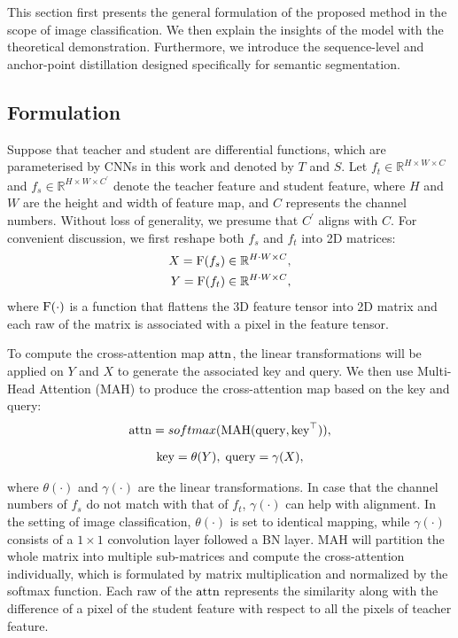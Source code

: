 \documentclass[10pt,twocolumn,letterpaper]{article}
\begin{document}
This section first presents the general formulation of the proposed method in the scope of image classification. We then explain the insights of the model with the theoretical demonstration. Furthermore, we introduce the sequence-level and anchor-point distillation designed specifically for semantic segmentation.  

\subsection{Formulation}
\label{sec:formulation}
Suppose that teacher and student are differential functions, which are parameterised by CNNs in this work and denoted by $T$ and $S$. Let $f_t\in {\mathbb{R}^{H\times W\times C}}$ and ${f_s}\in \mathbb{R}^{H\times W\times C^{'}}$ denote the teacher feature and student feature, where $H$ and $W$ are the height and width of feature map, and $C$ represents the channel numbers. Without loss of generality, we presume that $C^{'}$ aligns with $C$. For convenient discussion, we first reshape both $f_s$ and $f_t$ into 2D matrices:
\begin{equation}
\begin{aligned}
    X={\rm{F}}(f_s)\in \mathbb{R}^{H\cdot W \times C},\\ Y={\rm{F}}(f_t)\in \mathbb{R}^{H\cdot W \times C},
\end{aligned}
\end{equation}
\noindent where $\rm{F}(\cdot)$ is a function that flattens the 3D feature tensor into 2D matrix and each raw of the matrix is associated with a pixel in the feature tensor.

To compute the cross-attention map $\rm{attn}$, the linear transformations will be applied on $Y$ and $X$ to generate the associated key and query. We then use Multi-Head Attention (MAH) to produce the cross-attention map based on the key and query:
\begin{equation}
    {\rm{attn}}=softmax(\rm{MAH}({\rm{query}},{\rm{key}}^\top)),
    \label{eq:attn}
\end{equation}

\begin{equation}
\begin{aligned}
    {\rm{key}}=\theta(Y),\;{\rm{query}}=\gamma(X),
\end{aligned}
\end{equation}

\noindent where $\theta(\cdot)$ and $\gamma(\cdot)$ are the linear transformations. In case that the channel numbers of $f_s$ do not match with that of $f_t$, $\gamma(\cdot)$ can help with alignment. In the setting of image classification, $\theta(\cdot)$ is set to identical mapping, while $\gamma(\cdot)$ consists of a $1\times1$ convolution layer followed a BN layer. MAH will partition the whole matrix into multiple sub-matrices and compute the cross-attention individually, which is formulated by matrix multiplication and normalized by the softmax function. Each raw of the $\rm{attn}$ represents the similarity along with the difference of a pixel of the student feature with respect to all the pixels of teacher feature. 
\end{document}
